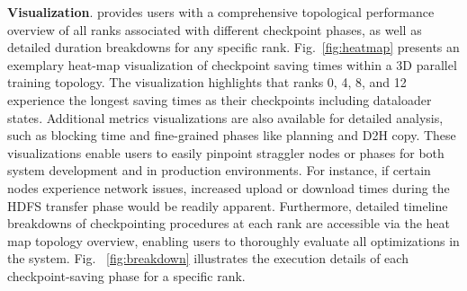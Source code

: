 \noindent \textbf{Visualization}. 
\sys{} provides users with a comprehensive topological performance overview of all ranks associated with different checkpoint phases, as well as detailed duration breakdowns for any specific rank.
Fig.~\ref{fig:heatmap} presents an exemplary heat-map visualization of checkpoint saving times within a 3D parallel training topology.
The visualization highlights that ranks 0, 4, 8, and 12 experience the longest saving times as their checkpoints including dataloader states. Additional metrics visualizations are also available for detailed analysis,
such as blocking time and fine-grained phases like planning and D2H copy. These visualizations enable users to easily pinpoint straggler nodes or phases for both system development and in production environments. For instance, if certain nodes experience network issues, increased upload or download times during the HDFS transfer phase would be readily apparent.
Furthermore, detailed timeline breakdowns of checkpointing procedures at each rank are accessible via the heat map topology overview, enabling users to thoroughly evaluate all optimizations in the system.
Fig. ~\ref{fig:breakdown} illustrates the execution details of each checkpoint-saving phase for a specific rank.



